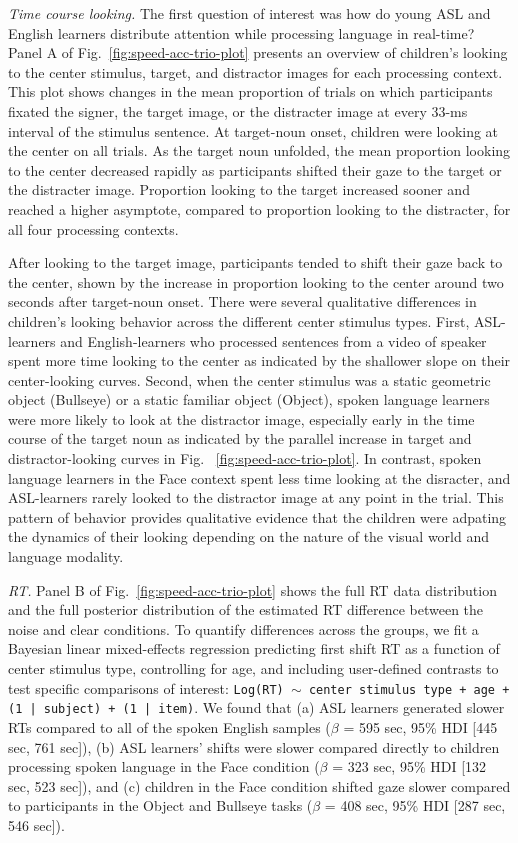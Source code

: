 \documentclass[english,floatsintext,man]{apa6}
\begin{document}
\emph{Time course looking.} The first question of interest was how do
young ASL and English learners distribute attention while processing
language in real-time? Panel A of Fig.~\ref{fig:speed-acc-trio-plot}
presents an overview of children's looking to the center stimulus,
target, and distractor images for each processing context. This plot
shows changes in the mean proportion of trials on which participants
fixated the signer, the target image, or the distracter image at every
33-ms interval of the stimulus sentence. At target-noun onset, children
were looking at the center on all trials. As the target noun unfolded,
the mean proportion looking to the center decreased rapidly as
participants shifted their gaze to the target or the distracter image.
Proportion looking to the target increased sooner and reached a higher
asymptote, compared to proportion looking to the distracter, for all
four processing contexts.

After looking to the target image, participants tended to shift their
gaze back to the center, shown by the increase in proportion looking to
the center around two seconds after target-noun onset. There were
several qualitative differences in children's looking behavior across
the different center stimulus types. First, ASL-learners and
English-learners who processed sentences from a video of speaker spent
more time looking to the center as indicated by the shallower slope on
their center-looking curves. Second, when the center stimulus was a
static geometric object (Bullseye) or a static familiar object (Object),
spoken language learners were more likely to look at the distractor
image, especially early in the time course of the target noun as
indicated by the parallel increase in target and distractor-looking
curves in Fig. ~\ref{fig:speed-acc-trio-plot}. In contrast, spoken
language learners in the Face context spent less time looking at the
disracter, and ASL-learners rarely looked to the distractor image at any
point in the trial. This pattern of behavior provides qualitative
evidence that the children were adpating the dynamics of their looking
depending on the nature of the visual world and language modality.

\emph{RT.} Panel B of Fig.~\ref{fig:speed-acc-trio-plot} shows the full
RT data distribution and the full posterior distribution of the
estimated RT difference between the noise and clear conditions. To
quantify differences across the groups, we fit a Bayesian linear
mixed-effects regression predicting first shift RT as a function of
center stimulus type, controlling for age, and including user-defined
contrasts to test specific comparisons of interest:
\texttt{Log(RT) $\sim$ center stimulus type + age +  (1 | subject) + (1 | item)}.
We found that (a) ASL learners generated slower RTs compared to all of
the spoken English samples (\(\beta\) = 595 sec, 95\% HDI {[}445 sec,
761 sec{]}), (b) ASL learners' shifts were slower compared directly to
children processing spoken language in the Face condition (\(\beta\) =
323 sec, 95\% HDI {[}132 sec, 523 sec{]}), and (c) children in the Face
condition shifted gaze slower compared to participants in the Object and
Bullseye tasks (\(\beta\) = 408 sec, 95\% HDI {[}287 sec, 546 sec{]}).
\end{document}
